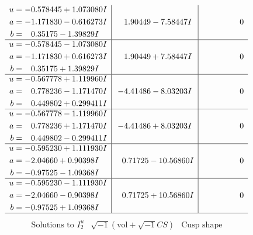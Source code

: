 \documentclass[1p]{elsarticle_modified}
\theoremstyle{definition}
\newcommand{\I}{\sqrt{-1}}
\begin{document}
$$\begin{array}{c|c|c}
\begin{aligned}
u &= -0.578445 + 1.073080 I \\
a &= -1.171830 - 0.616273 I \\
b &= \phantom{-}0.35175 - 1.39829 I\end{aligned}
 & \phantom{-}1.90449 - 7.58447 I & \phantom{-0.000000 } 0 \\ \hline\begin{aligned}
u &= -0.578445 - 1.073080 I \\
a &= -1.171830 + 0.616273 I \\
b &= \phantom{-}0.35175 + 1.39829 I\end{aligned}
 & \phantom{-}1.90449 + 7.58447 I & \phantom{-0.000000 } 0 \\ \hline\begin{aligned}
u &= -0.567778 + 1.119960 I \\
a &= \phantom{-}0.778236 - 1.171470 I \\
b &= \phantom{-}0.449802 + 0.299411 I\end{aligned}
 & -4.41486 - 8.03203 I & \phantom{-0.000000 } 0 \\ \hline\begin{aligned}
u &= -0.567778 - 1.119960 I \\
a &= \phantom{-}0.778236 + 1.171470 I \\
b &= \phantom{-}0.449802 - 0.299411 I\end{aligned}
 & -4.41486 + 8.03203 I & \phantom{-0.000000 } 0 \\ \hline\begin{aligned}
u &= -0.595230 + 1.111930 I \\
a &= -2.04660 + 0.90398 I \\
b &= -0.97525 - 1.09368 I\end{aligned}
 & \phantom{-}0.71725 - 10.56860 I & \phantom{-0.000000 } 0 \\ \hline\begin{aligned}
u &= -0.595230 - 1.111930 I \\
a &= -2.04660 - 0.90398 I \\
b &= -0.97525 + 1.09368 I\end{aligned}
 & \phantom{-}0.71725 + 10.56860 I & \phantom{-0.000000 } 0\\
 \hline 
 \end{array}$$\newpage$$\begin{array}{c|c|c}  
\text{Solutions to }I^u_{2}& \I (\text{vol} + \sqrt{-1}CS) & \text{Cusp shape}\\
 \hline 
\begin{aligned}

\end{aligned}
\end{array}$$
\end{document}

